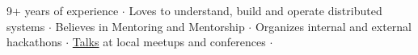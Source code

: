 

\begin{cvparagraph}
9+ years of experience ${\cdotp}$ Loves to understand, build and operate distributed systems ${\cdotp}$ Believes in Mentoring and Mentorship ${\cdotp}$ Organizes internal and external hackathons ${\cdotp}$ \href{https://github.com/ashwanthkumar/talks}{Talks} at local meetups and conferences ${\cdotp}$
\end{cvparagraph}
